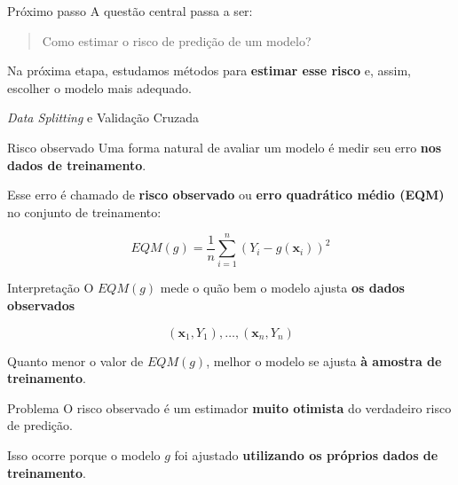 \documentclass[
  ignorenonframetext,
  aspectratio=169,
]{beamer}
\begin{document}
\begin{frame}
\begin{block}{Próximo passo}
\label{pruxf3ximo-passo}
A questão central passa a ser:

\begin{quote}
Como estimar o risco de predição de um modelo?
\end{quote}

Na próxima etapa, estudamos métodos para \textbf{estimar esse risco} e,
assim, escolher o modelo mais adequado.
\end{block}
\end{frame}

\begin{frame}{\emph{Data Splitting} e Validação Cruzada}
\label{data-splitting-e-validauxe7uxe3o-cruzada}
\begin{block}{Risco observado}
\label{risco-observado}
Uma forma natural de avaliar um modelo é medir seu erro \textbf{nos
dados de treinamento}.

Esse erro é chamado de \textbf{risco observado} ou \textbf{erro
quadrático médio (EQM)} no conjunto de treinamento:

\[
EQM(g) = \frac{1}{n}\sum_{i=1}^{n} (Y_i - g(\mathbf{x}_i))^2
\]
\end{block}
\end{frame}

\begin{frame}
\begin{block}{Interpretação}
\label{interpretauxe7uxe3o-1}
O \(EQM(g)\) mede o quão bem o modelo ajusta \textbf{os dados
observados}

\[
(\mathbf{x}_1,Y_1),\ldots,(\mathbf{x}_n,Y_n)
\]

Quanto menor o valor de \(EQM(g)\), melhor o modelo se ajusta \textbf{à
amostra de treinamento}.
\end{block}

\begin{block}{Problema}
\label{problema}
O risco observado é um estimador \textbf{muito otimista} do verdadeiro
risco de predição.

Isso ocorre porque o modelo \(g\) foi ajustado \textbf{utilizando os
próprios dados de treinamento}.
\end{block}
\end{frame}
\end{document}
